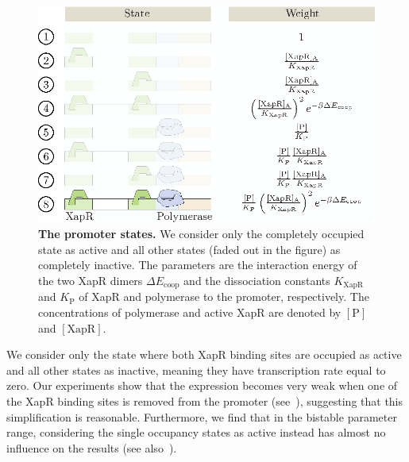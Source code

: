 \documentclass[10pt,letterpaper]{article}
\newcommand{\n}[1]{\mathrm{#1}}
\begin{document}
	\begin{figure}%
		\centering
		\includegraphics{media/Fig3_states.eps}
		\caption{{\bf The promoter states.} We consider only the completely
			occupied state as active and all other states (faded out in the figure)
			as completely inactive. The parameters are the interaction energy of
			the two XapR dimers $\Delta E_{\n{coop}}$ and the dissociation
			constants $K_{\n{XapR}}$ and $K_{\n{P}}$ of XapR and polymerase
			to the promoter, respectively. The concentrations of polymerase
			and active XapR are denoted by $\n{[P]}$ and $\n{[XapR]}$.}
		\label{fig3:states}
	\end{figure}
	
	We consider only the state where both XapR binding sites are occupied as
	active and all other states as inactive, meaning they have transcription
	rate equal to zero. Our experiments show that the expression becomes very weak when one of
	the XapR binding sites is removed from the promoter (see~), suggesting that this
	simplification is reasonable. Furthermore, we find that in
	the bistable parameter range, considering the single occupancy states as
	active instead has almost no influence on the results (see
	also~).
	
\end{document}
